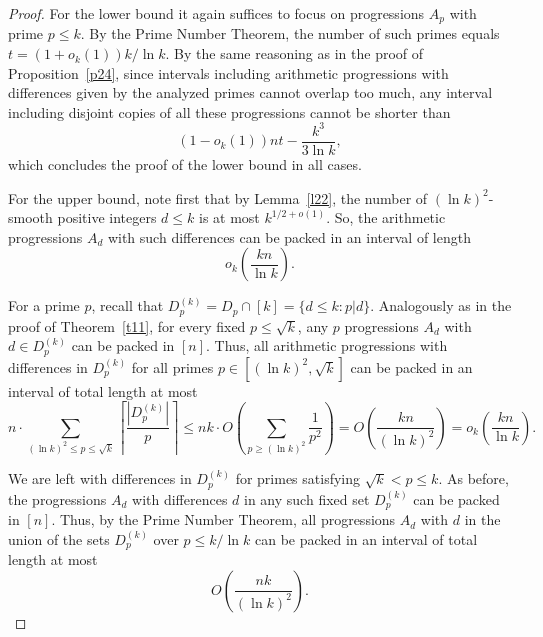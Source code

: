 \documentclass[12pt]{amsart}
\theoremstyle{plain}
\numberwithin{equation}{section}
\begin{document}
	\begin{proof} 
		For the lower bound it again suffices to focus on progressions $A_p$ with prime $p\leqslant k$. By the Prime Number Theorem, the number of such primes equals $t=(1+o_k(1))k/\ln k$. 
		By the same reasoning as in the proof of Proposition~\ref{p24}, 
		since intervals including arithmetic progressions with differences given by the analyzed primes cannot overlap too much, any interval including disjoint copies of all these progressions cannot be shorter than
		$$\left(1-o_k(1)\right)nt-\frac{k^3}{3\ln k},$$
		which concludes the proof of the lower bound in all cases.


		For the upper bound, note first that by Lemma~\ref{l22}, the number of $(\ln k)^2$-smooth positive integers $d\leqslant k$ is at most $k^{1/2+o(1)}$. So, the arithmetic progressions $A_d$ with such differences can be packed in an interval of length 
		\begin{equation}\label{PackingInitial1}
		o_k\left(\frac{kn}{\ln k}\right).
		\end{equation}
		
		For a prime $p$, recall that $D_p^{(k)}=D_p\cap [k]=\{d\leqslant k: p|d \}$. Analogously as in the proof of Theorem~\ref{t11}, 
		for every fixed $p\leqslant \sqrt{k}$, any $p$ progressions $A_d$ with $d\in D_p^{(k)}$ can be packed in $[n]$. Thus, all arithmetic progressions with differences in $D_p^{(k)}$ for all primes $p\in [(\ln k)^2, \sqrt{k}]$ can be packed in an interval of total length at most
		\begin{equation}\label{PackingInitial2}
		n\cdot\sum_{(\ln k)^2\leqslant p \leqslant \sqrt{k}}\left\lceil\frac{|D_p^{(k)}|}{p}\right\rceil \leqslant nk\cdot O\left(\sum_{p\geqslant (\ln k)^2}\frac{1}{p^2}\right) = O\left(\frac{kn}{(\ln k)^2}\right) = o_k\left(\frac{kn}{\ln k}\right).
		\end{equation}

		We are left with differences in $D_p^{(k)}$ for primes satisfying $\sqrt{k}<p\leqslant k$.
		As before, 
		the progressions $A_d$ with differences $d$ in any such fixed set $D_p^{(k)}$ can be packed in $[n]$.
		Thus, by the Prime Number Theorem, all progressions $A_d$ with $d$ in the union of the sets $D_p^{(k)}$ over $p\leqslant k/\ln k$ can be packed in an interval of total length at most 
		\begin{equation}\label{PackingInitial3}
		O\left(\frac{nk}{(\ln k)^2}\right).
		\end{equation}
		

\end{proof}
\end{document}
